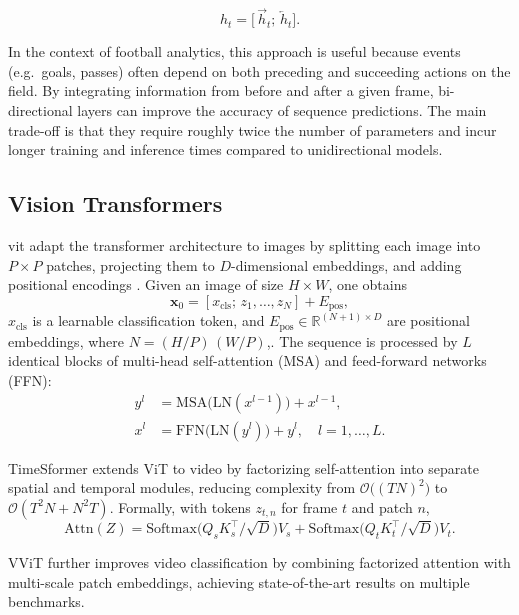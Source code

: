 \[
h_t = \bigl[\,\overrightarrow{h}_t;\,\overleftarrow{h}_t\bigr].
\]

In the context of football analytics, this approach is useful because events (e.g.\ goals, passes) often depend on both preceding and succeeding actions on the field. By integrating information from before and after a given frame, bi-directional layers can improve the accuracy of sequence predictions. The main trade-off is that they require roughly twice the number of parameters and incur longer training and inference times compared to unidirectional models.


\subsection{Vision Transformers}
\label{ssec:vision_transformers}

\acrfull{vit} adapt the transformer architecture \cite{vaswani_attention_2017}  to images by splitting each image into $P\times P$ patches, projecting them to $D$-dimensional embeddings, and adding positional encodings \cite{dosovitskiy_image_transformer_2021}. Given an image of size $H\times W$, one obtains
\[
\mathbf{x}_0 = [x_{\text{cls}};\,z_1,\dots,z_N] + E_{\text{pos}},
\]
$x_{\text{cls}}$ is a learnable classification token, and $E_{\text{pos}}\in\mathbb{R}^{(N+1)\times D}$ are positional embeddings, where $N=(H/P)\,(W/P)$,. The sequence is processed by $L$ identical blocks of multi-head self-attention (MSA) and feed-forward networks (FFN)\cite{dosovitskiy_image_transformer_2021}:
\begin{align*}
y^l &= \mathrm{MSA}\bigl(\mathrm{LN}(x^{l-1})\bigr) + x^{l-1},\\
x^l &= \mathrm{FFN}\bigl(\mathrm{LN}(y^l)\bigr) + y^l,\quad l=1,\dots,L.
\end{align*}

TimeSformer \cite{bertasius_timesformer_2021} extends ViT to video by factorizing self-attention into separate spatial and temporal modules, reducing complexity from $\mathcal{O}\bigl((TN)^2\bigr)$ to $\mathcal{O}(T^2N + N^2T)$. Formally, with tokens $z_{t,n}$ for frame $t$ and patch $n$,
\[
\mathrm{Attn}(Z)
= \mathrm{Softmax}\!\bigl(Q_sK_s^\top/\sqrt{D}\bigr)V_s
+ \mathrm{Softmax}\!\bigl(Q_tK_t^\top/\sqrt{D}\bigr)V_t.
\]

VViT \cite{arnab_vvit_2021} further improves video classification by combining factorized attention with multi-scale patch embeddings, achieving state-of-the-art results on multiple benchmarks.


